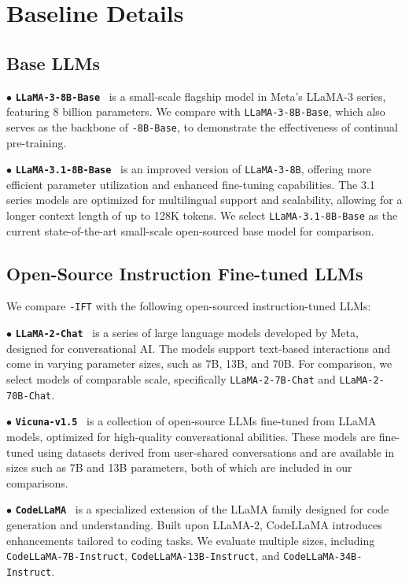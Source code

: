 \section{Baseline Details}
\label{app:baseline}

\subsection{Base LLMs}

\noindent $\bullet$ \textbf{\texttt{LLaMA-3-8B-Base}}~\cite{dubey2024llama} is a small-scale flagship model in Meta's LLaMA-3 series, featuring 8 billion parameters. We compare \method with \texttt{LLaMA-3-8B-Base}, which also serves as the backbone of \texttt{\method-8B-Base}, to demonstrate the effectiveness of continual pre-training.

\noindent $\bullet$ \textbf{\texttt{LLaMA-3.1-8B-Base}}~\cite{dubey2024llama} is an improved version of \texttt{LLaMA-3-8B}, offering more efficient parameter utilization and enhanced fine-tuning capabilities. The 3.1 series models are optimized for multilingual support and scalability, allowing for a longer context length of up to 128K tokens. We select \texttt{LLaMA-3.1-8B-Base} as the current state-of-the-art small-scale open-sourced base model for comparison.

\subsection{Open-Source Instruction Fine-tuned LLMs}
We compare \texttt{\method-IFT} with the following open-sourced instruction-tuned LLMs:

\noindent$\bullet$ \textbf{\texttt{LLaMA-2-Chat}}~\cite{touvron2023llama} is a series of large language models developed by Meta, designed for conversational AI. The models support text-based interactions and come in varying parameter sizes, such as 7B, 13B, and 70B. For comparison, we select models of comparable scale, specifically \texttt{LLaMA-2-7B-Chat} and \texttt{LLaMA-2-70B-Chat}.

\noindent$\bullet$ \textbf{\texttt{Vicuna-v1.5}}~\cite{chiang2023vicuna} is a collection of open-source LLMs fine-tuned from LLaMA models, optimized for high-quality conversational abilities. These models are fine-tuned using datasets derived from user-shared conversations and are available in sizes such as 7B and 13B parameters, both of which are included in our comparisons.

\noindent$\bullet$ \textbf{\texttt{CodeLLaMA}}~\cite{roziere2023code} is a specialized extension of the LLaMA family designed for code generation and understanding. Built upon LLaMA-2, CodeLLaMA introduces enhancements tailored to coding tasks. We evaluate multiple sizes, including \texttt{CodeLLaMA-7B-Instruct}, \texttt{CodeLLaMA-13B-Instruct}, and \texttt{CodeLLaMA-34B-Instruct}.

